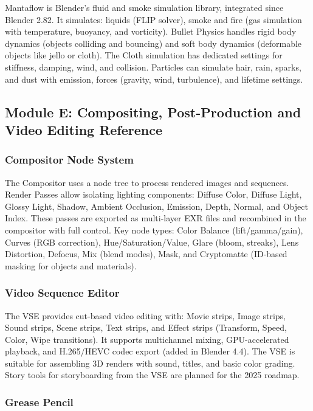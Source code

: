 \documentclass[11pt,letterpaper]{article}
\begin{document}
Mantaflow is Blender's fluid and smoke simulation library, integrated since Blender 2.82. It simulates: liquids (FLIP solver), smoke and fire (gas simulation with temperature, buoyancy, and vorticity). Bullet Physics handles rigid body dynamics (objects colliding and bouncing) and soft body dynamics (deformable objects like jello or cloth). The Cloth simulation has dedicated settings for stiffness, damping, wind, and collision. Particles can simulate hair, rain, sparks, and dust with emission, forces (gravity, wind, turbulence), and lifetime settings.

\subsection{Module E: Compositing, Post-Production and Video Editing Reference}

\subsubsection{Compositor Node System}

The Compositor uses a node tree to process rendered images and sequences. Render Passes allow isolating lighting components: Diffuse Color, Diffuse Light, Glossy Light, Shadow, Ambient Occlusion, Emission, Depth, Normal, and Object Index. These passes are exported as multi-layer EXR files and recombined in the compositor with full control. Key node types: Color Balance (lift/gamma/gain), Curves (RGB correction), Hue/Saturation/Value, Glare (bloom, streaks), Lens Distortion, Defocus, Mix (blend modes), Mask, and Cryptomatte (ID-based masking for objects and materials).

\subsubsection{Video Sequence Editor}

The VSE provides cut-based video editing with: Movie strips, Image strips, Sound strips, Scene strips, Text strips, and Effect strips (Transform, Speed, Color, Wipe transitions). It supports multichannel mixing, GPU-accelerated playback, and H.265/HEVC codec export (added in Blender 4.4). The VSE is suitable for assembling 3D renders with sound, titles, and basic color grading. Story tools for storyboarding from the VSE are planned for the 2025 roadmap.

\subsubsection{Grease Pencil}
\end{document}
